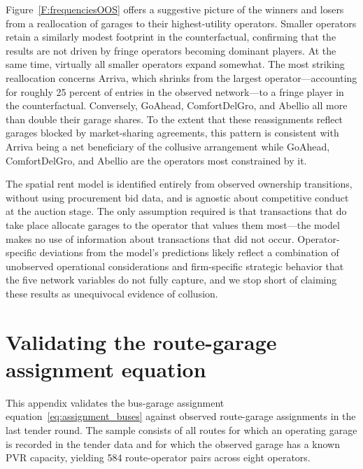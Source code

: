 \documentclass[12pt]{article}
\begin{document}
Figure~\ref{F:frequenciesOOS} offers a suggestive picture of the winners 
and losers from a reallocation of garages to their highest-utility operators. 
Smaller operators retain a similarly modest footprint in the counterfactual, 
confirming that the results are not driven by fringe operators becoming 
dominant players. At the same time, virtually all smaller operators expand 
somewhat. The most striking reallocation concerns Arriva, which shrinks from 
the largest operator---accounting for roughly 25 percent of entries in the 
observed network---to a fringe player in the counterfactual. Conversely, 
GoAhead, ComfortDelGro, and Abellio all more than double their garage shares. 
To the extent that these reassignments reflect garages blocked by 
market-sharing agreements, this pattern is consistent with Arriva being a 
net beneficiary of the collusive arrangement while GoAhead, ComfortDelGro, 
and Abellio are the operators most constrained by it.

The spatial rent model is identified entirely from observed ownership 
transitions, without using procurement bid data, and is agnostic about 
competitive conduct at the auction stage. The only assumption required is 
that transactions that do take place allocate garages to the operator that 
values them most---the model makes no use of information about transactions 
that did not occur. Operator-specific deviations from the model's predictions 
likely reflect a combination of unobserved operational considerations and 
firm-specific strategic behavior that the five network variables do not fully 
capture, and we stop short of claiming these results as unequivocal evidence 
of collusion.

\clearpage
\section{Validating the route-garage assignment equation}
\label{A:assignment_validation}
\setcounter{table}{0}
\renewcommand{\thetable}{D\arabic{table}}
\setcounter{figure}{0}
\renewcommand{\thefigure}{D\arabic{figure}}

This appendix validates the bus-garage assignment equation~\eqref{eq:assignment_buses} against observed
route-garage assignments in the last tender round. The sample consists of
all routes for which an operating garage is recorded in the tender data and
for which the observed garage has a known PVR capacity, yielding 584
route-operator pairs across eight operators.
 
\end{document}
